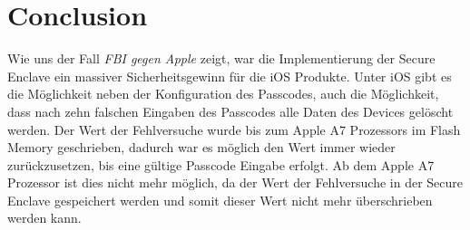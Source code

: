 %
%
%
% 


\chapter{Conclusion}
\label{ch:Conclusion}

Wie uns der Fall \textit{\glqq FBI gegen Apple\grqq{}} zeigt, war die Implementierung der Secure Enclave ein massiver Sicherheitsgewinn für die iOS Produkte. Unter iOS gibt es die Möglichkeit neben der Konfiguration des Passcodes, auch die Möglichkeit, dass nach zehn falschen Eingaben des Passcodes alle Daten des Devices gelöscht werden. Der Wert der Fehlversuche wurde bis zum Apple A7 Prozessors im Flash Memory geschrieben, dadurch war es möglich den Wert immer wieder zurückzusetzen, bis eine gültige Passcode Eingabe erfolgt. Ab dem Apple A7 Prozessor ist dies nicht mehr möglich, da der Wert der Fehlversuche in der Secure Enclave gespeichert werden und somit dieser Wert nicht mehr überschrieben werden kann. 
